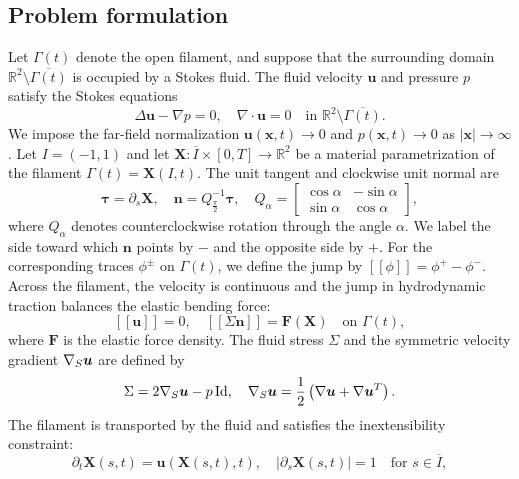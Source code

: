 \documentclass[11pt,reqno]{amsart}
\theoremstyle{plain}
\theoremstyle{definition}
\numberwithin{equation}{section}
\DeclareMathOperator{\Id}{Id}
\newcommand{\paren}[1]{\left(#1\right)}
\newcommand{\jump}[1]{\left[\!\left[ #1\right]\!\right]}
\newcommand{\p}{\partial}
\newcommand{\grad}[1]{\nabla #1}
\newcommand{\bm}[1]{\boldsymbol{#1}}
\newcommand{\abs}[1]{\left\lvert #1 \right\rvert}
\newcommand{\R}{\mathbb{R}}
\begin{document}
\subsection{Problem formulation}
\label{subsec:prob-formulation}
Let $\Gamma(t)$ denote the open filament, and suppose that the surrounding domain $\mathbb{R}^2\setminus\overline{\Gamma(t)}$ is occupied by a Stokes fluid.
The fluid velocity $\bm u$ and pressure $p$ satisfy the Stokes equations
\begin{equation}\label{eqn:intro-stokes-bulk}
    \Delta\bm u-\grad p=0,
    \quad \grad\cdot\bm u=0
    \quad\text{in }\R^2\setminus\overline{\Gamma(t)}.
\end{equation}
We impose the far-field normalization $\bm u(\bm x,t)\to0$ and
$p(\bm x,t)\to0$ as $\abs{\bm x}\to\infty$. Let
$I=(-1,1)$ and let $\bm X:\overline I\times[0,T]\to\R^2$ be a material
parametrization of the filament
$\Gamma(t)=\bm X(I,t)$. The unit tangent and clockwise unit normal are
\begin{equation}
    \bm\tau = \p_s\bm X, \quad \bm n  = Q_{\frac{\pi}{2}}^{-1}\bm \tau, \quad Q_{\alpha} =
    \begin{bmatrix}
        \cos\alpha & -\sin\alpha\\
        \sin\alpha & \cos\alpha
    \end{bmatrix},
\end{equation}
where $Q_\alpha$ denotes counterclockwise rotation through the angle $\alpha$.
We label the side toward which $\bm n$ points by $-$ and the opposite side
by $+$. For the corresponding traces $\phi^\pm$ on $\Gamma(t)$, we define the jump by
$\jump{\phi}=\phi^+-\phi^-$.
Across the filament, the velocity is continuous and the jump in
hydrodynamic traction balances the elastic bending force:
\begin{equation}\label{eqn:intro-stokes-interface}
    \jump{\bm u}=0,
    \quad
    \jump{\Sigma\bm n}
    =\bm F(\bm X)
    \quad\text{on }\Gamma(t),
\end{equation}
where $\bm F$ is the elastic force density. The fluid stress $\Sigma$ and the symmetric velocity gradient
$\grad_S\bm u$ are defined by
\begin{equation*}
    \Sigma=2\grad_S\bm u-p\Id,
    \quad
    \grad_S\bm u=\frac12\paren{\grad\bm u+\grad\bm u^T}.
\end{equation*}
The filament is transported by the fluid and satisfies the inextensibility
constraint:
\begin{equation}\label{eqn:intro-kinematic}
    \p_t\bm X(s,t)=\bm u(\bm X(s,t),t),
    \quad \abs{\p_s\bm X(s,t)}=1
    \quad\text{for }s\in\overline I,
\end{equation}
\end{document}
